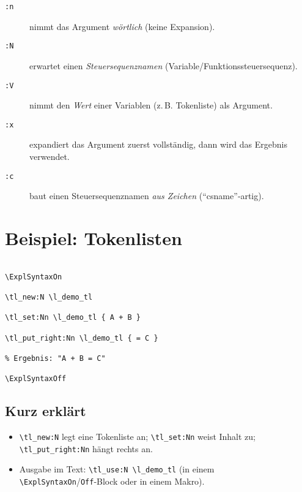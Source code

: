 \documentclass[11pt,a4paper]{book}
\begin{document}
\begin{description}

  \item[\texttt{:n}] nimmt das Argument \emph{wörtlich} (keine Expansion).

  \item[\texttt{:N}] erwartet einen \emph{Steuersequenznamen} (Variable/Funktionssteuersequenz).

  \item[\texttt{:V}] nimmt den \emph{Wert} einer Variablen (z.\,B. Tokenliste) als Argument.

  \item[\texttt{:x}] expandiert das Argument zuerst vollständig, dann wird das Ergebnis verwendet.

  \item[\texttt{:c}] baut einen Steuersequenznamen \emph{aus Zeichen} (\enquote{csname}‑artig).

\end{description}



\section{Beispiel: Tokenlisten}

\begin{verbatim}

\ExplSyntaxOn

\tl_new:N \l_demo_tl

\tl_set:Nn \l_demo_tl { A + B }

\tl_put_right:Nn \l_demo_tl { = C }

% Ergebnis: "A + B = C"

\ExplSyntaxOff

\end{verbatim}



\subsection*{Kurz erklärt}

\begin{itemize}

  \item \verb|\tl_new:N| legt eine Tokenliste an; \verb|\tl_set:Nn| weist Inhalt zu; \verb|\tl_put_right:Nn| hängt rechts an.

  \item Ausgabe im Text: \verb|\tl_use:N \l_demo_tl| (in einem \verb|\ExplSyntaxOn|/\verb|Off|‑Block oder in einem Makro).

\end{itemize}
\end{document}
